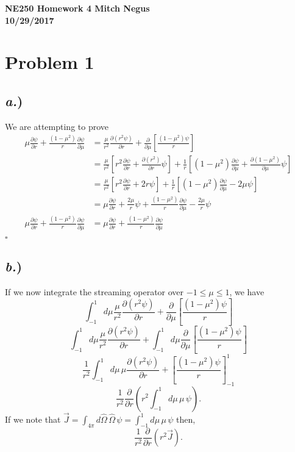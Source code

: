 \documentclass{article}
\newcommand{\tab}{\-\hspace{1cm}}
\newcommand{\p}{\partial}
\newcommand{\cur}{\vec{J}}
\newcommand{\Oh}{\hat{\Omega}}
\newcommand{\intfp}{\int_{4\pi}}
\begin{document}
\thispagestyle{empty}

{\bf {\large {NE250 Homework {4} \hfill Mitch Negus\\
		\hspace*{\fill} 10/29/2017\\ }}}
		
		
		

\section*{Problem 1}

\subsection*{\textit{a.})}

We are attempting to prove
\begin{align*}
\mu\frac{\p \psi}{\p r} + \frac{(1-\mu^2)}{r}\frac{\p \psi}{\p \mu} 
		&= \frac{\mu}{r^2}\frac{\p(r^2\psi)}{\p r} + \frac{\p}{\p \mu}\left[\frac{(1-\mu^2)\psi}{r}\right] \\
		&= \frac{\mu}{r^2}\left[r^2\frac{\p \psi}{\p r} + \frac{\p(r^2)}{\p r}\psi\right] + \frac{1}{r}\left[(1-\mu^2)\frac{\p \psi}{\p \mu} + \frac{\p(1-\mu^2)}{\p \mu}\psi\right] \\
				&= \frac{\mu}{r^2}\left[r^2\frac{\p \psi}{\p r} + 2r\psi\right] + \frac{1}{r}\left[(1-\mu^2)\frac{\p \psi}{\p \mu} - 2\mu\psi\right] \\
				&= \mu\frac{\p \psi}{\p r} + \frac{2\mu}{r}\psi + \frac{(1-\mu^2)}{r}\frac{\p \psi}{\p \mu} - \frac{2\mu}{r}\psi \\
\mu\frac{\p \psi}{\p r} + \frac{(1-\mu^2)}{r}\frac{\p \psi}{\p \mu}	&= \mu\frac{\p \psi}{\p r} + \frac{(1-\mu^2)}{r}\frac{\p \psi}{\p \mu}\\
\end{align*}
\tab\tab\tab$\square$

\subsection*{\textit{b.})}

If we now integrate the streaming operator over $-1 \leq \mu \leq 1$, we have
$$ \int_{-1}^{1} d\mu \frac{\mu}{r^2}\frac{\p(r^2\psi)}{\p r} + \frac{\p}{\p \mu}\left[\frac{(1-\mu^2)\psi}{r}\right] $$
$$ \int_{-1}^{1} d\mu \frac{\mu}{r^2}\frac{\p(r^2\psi)}{\p r} + \int_{-1}^{1} d\mu  \frac{\p}{\p \mu}\left[\frac{(1-\mu^2)\psi}{r}\right] $$
$$ \frac{1}{r^2} \int_{-1}^{1} d\mu \, \mu \frac{\p(r^2\psi)}{\p r} + \left[ \frac{(1-\mu^2)\psi}{r}\right]_{-1}^{1} $$
$$ \frac{1}{r^2} \frac{\p }{\p r} \left( r^2 \int_{-1}^{1} d\mu \, \mu \, \psi \right) .$$
If we note that $\cur = \intfp d\Oh \, \Oh \, \psi = \int_{-1}^{1} d\mu \, \mu \, \psi$ then,
$$\boxed{ \frac{1}{r^2} \frac{\p }{\p r} \left( r^2 \cur \right) }.$$
\end{document}
